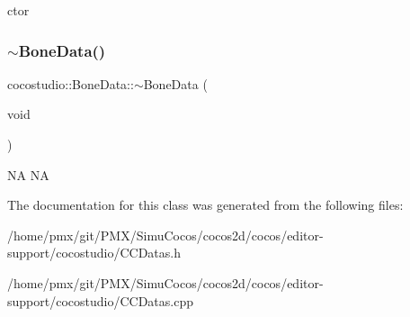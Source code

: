 ctor \mbox{\label{classcocostudio_1_1BoneData_afbfe49c55c3e2a02c283ce9a896eb49e}} 
\subsubsection{\texorpdfstring{$\sim$\+Bone\+Data()}{~BoneData()}\hspace{0.1cm}{\footnotesize\ttfamily [2/2]}}
{\footnotesize\ttfamily cocostudio\+::\+Bone\+Data\+::$\sim$\+Bone\+Data (\begin{DoxyParamCaption}\item[{void}]{ }\end{DoxyParamCaption})}

NA  NA 

The documentation for this class was generated from the following files\+:\begin{DoxyCompactItemize}
\item 
/home/pmx/git/\+P\+M\+X/\+Simu\+Cocos/cocos2d/cocos/editor-\/support/cocostudio/C\+C\+Datas.\+h\item 
/home/pmx/git/\+P\+M\+X/\+Simu\+Cocos/cocos2d/cocos/editor-\/support/cocostudio/C\+C\+Datas.\+cpp\end{DoxyCompactItemize}
